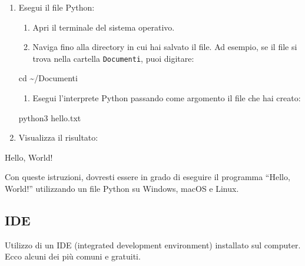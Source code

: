 \documentclass[
  letterpaper,
]{scrbook}
\newenvironment{Shaded}{\begin{snugshade}}{\end{snugshade}}
\newcommand{\BuiltInTok}[1]{\textcolor[rgb]{0.00,0.23,0.31}{#1}}
\newcommand{\ExtensionTok}[1]{\textcolor[rgb]{0.00,0.23,0.31}{#1}}
\newcommand{\NormalTok}[1]{\textcolor[rgb]{0.00,0.23,0.31}{#1}}
\providecommand{\tightlist}{%
  \setlength{\itemsep}{0pt}\setlength{\parskip}{0pt}}\usepackage{longtable,booktabs,array}
\begin{document}
\begin{enumerate}
\def\labelenumi{\arabic{enumi}.}
\setcounter{enumi}{2}
\item
  Esegui il file Python:

  \begin{enumerate}
  \def\labelenumii{\roman{enumii}.}
  \tightlist
  \item
    Apri il terminale del sistema operativo.
  \item
    Naviga fino alla directory in cui hai salvato il file. Ad esempio,
    se il file si trova nella cartella \texttt{Documenti}, puoi
    digitare:
  \end{enumerate}

\begin{Shaded}
\begin{Highlighting}[]
\BuiltInTok{cd}\NormalTok{ \textasciitilde{}/Documenti}
\end{Highlighting}
\end{Shaded}

  \begin{enumerate}
  \def\labelenumii{\roman{enumii}.}
  \setcounter{enumii}{2}
  \tightlist
  \item
    Esegui l'interprete Python passando come argomento il file che hai
    creato:
  \end{enumerate}

\begin{Shaded}
\begin{Highlighting}[]
\ExtensionTok{python3}\NormalTok{ hello.txt}
\end{Highlighting}
\end{Shaded}
\item
  Visualizza il risultato:
\end{enumerate}

\begin{Shaded}
\begin{Highlighting}[]
\ExtensionTok{Hello,}\NormalTok{ World!}
\end{Highlighting}
\end{Shaded}

Con queste istruzioni, dovresti essere in grado di eseguire il programma
``Hello, World!'' utilizzando un file Python su Windows, macOS e Linux.

\subsection{IDE}\label{ide}

Utilizzo di un IDE (integrated development environment) installato sul
computer. Ecco alcuni dei più comuni e gratuiti.
\end{document}
